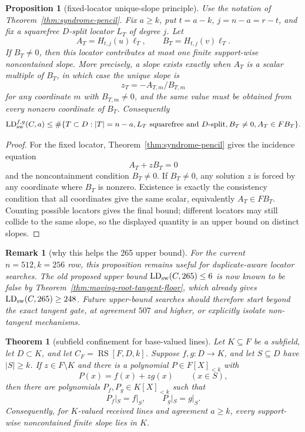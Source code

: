 \documentclass[11pt]{article}
\newtheorem{theorem}{Theorem}
\newtheorem{proposition}{Proposition}
\newtheorem{remark}{Remark}
\newcommand{\RS}{\operatorname{RS}}
\begin{document}
\begin{proposition}[fixed-locator unique-slope principle]
\label{prop:fixed-locator-unique-slope}
Use the notation of Theorem~\ref{thm:syndrome-pencil}.  Fix
\(a\ge k\), put \(t=a-k\), \(j=n-a=r-t\), and fix a squarefree
\(D\)-split locator \(L_T\) of degree \(j\).  Let
\[
  A_T=H_{t,j}(u)\boldsymbol\ell_T,
  \qquad
  B_T=H_{t,j}(v)\boldsymbol\ell_T.
\]
If \(B_T\ne0\), then this locator contributes at most one finite
support-wise noncontained slope.  More precisely, a slope exists exactly when
\(A_T\) is a scalar multiple of \(B_T\), in which case the unique slope is
\[
  z_T=-A_{T,m}/B_{T,m}
\]
for any coordinate \(m\) with \(B_{T,m}\ne0\), and the same value must be
obtained from every nonzero coordinate of \(B_T\).
Consequently
\[
  \operatorname{LD}_{\rm sw}^{f,g}(C,a)
  \le
  \#\{T\subset D:
        |T|=n-a,
        L_T\text{ squarefree and }D\text{-split},
        B_T\ne0,
        A_T\in F B_T\}.
\]
\end{proposition}

\begin{proof}
For the fixed locator, Theorem~\ref{thm:syndrome-pencil} gives the incidence
equation
\[
  A_T+zB_T=0
\]
and the noncontainment condition \(B_T\ne0\).  If \(B_T\ne0\), any solution
\(z\) is forced by any coordinate where \(B_T\) is nonzero.  Existence is exactly
the consistency condition that all coordinates give the same scalar, equivalently
\(A_T\in F B_T\).  Counting possible locators gives the final bound; different
locators may still collide to the same slope, so the displayed quantity is an
upper bound on distinct slopes.
\end{proof}

\begin{remark}[why this helps the 265 upper bound]
For the current \(n=512,k=256\) row, this proposition remains useful for
duplicate-aware locator searches.  The old proposed upper bound
\(\operatorname{LD}_{\rm sw}(C,265)\le6\) is now known to be false by
Theorem~\ref{thm:moving-root-tangent-floor}, which already gives
\(\operatorname{LD}_{\rm sw}(C,265)\ge248\).  Future upper-bound searches should
therefore start beyond the exact tangent gate, at agreement \(507\) and higher,
or explicitly isolate non-tangent mechanisms.
\end{remark}

\begin{theorem}[subfield confinement for base-valued lines]
\label{thm:subfield-confinement-base-lines}
Let \(K\subseteq F\) be a subfield, let \(D\subset K\), and let
\(C_F=\RS[F,D,k]\).  Suppose \(f,g:D\to K\), and let
\(S\subseteq D\) have \(|S|\ge k\).  If \(z\in F\setminus K\) and there is a
polynomial \(P\in F[X]_{<k}\) with
\[
  P(x)=f(x)+zg(x)
  \qquad (x\in S),
\]
then there are polynomials \(P_f,P_g\in K[X]_{<k}\) such that
\[
  P_f|_S=f|_S,
  \qquad
  P_g|_S=g|_S.
\]
Consequently, for \(K\)-valued received lines and agreement \(a\ge k\), every
support-wise noncontained finite slope lies in \(K\).
\end{theorem}
\end{document}
